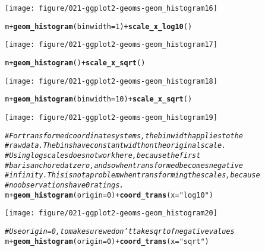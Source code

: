 \documentclass[a4paper,titlepage]{tufte-handout}\usepackage[]{graphicx}\usepackage[]{color}
\makeatletter
\def\maxwidth{ %
  \ifdim\Gin@nat@width>\linewidth
    \linewidth
  \else
    \Gin@nat@width
  \fi
}
\newcommand{\hlnum}[1]{\textcolor[rgb]{0.686,0.059,0.569}{#1}}%
\newcommand{\hlstr}[1]{\textcolor[rgb]{0.192,0.494,0.8}{#1}}%
\newcommand{\hlcom}[1]{\textcolor[rgb]{0.678,0.584,0.686}{\textit{#1}}}%
\newcommand{\hlopt}[1]{\textcolor[rgb]{0,0,0}{#1}}%
\newcommand{\hlstd}[1]{\textcolor[rgb]{0.345,0.345,0.345}{#1}}%
\newcommand{\hlkwc}[1]{\textcolor[rgb]{0.333,0.667,0.333}{#1}}%
\newcommand{\hlkwd}[1]{\textcolor[rgb]{0.737,0.353,0.396}{\textbf{#1}}}%
\newenvironment{kframe}{%
 \def\at@end@of@kframe{}%
 \ifinner\ifhmode%
  \def\at@end@of@kframe{\end{minipage}}%
  \begin{minipage}{\columnwidth}%
 \fi\fi%
 \def\FrameCommand##1{\hskip\@totalleftmargin \hskip-\fboxsep
 \colorbox{shadecolor}{##1}\hskip-\fboxsep
     \hskip-\linewidth \hskip-\@totalleftmargin \hskip\columnwidth}%
 \MakeFramed {\advance\hsize-\width
   \@totalleftmargin\z@ \linewidth\hsize
   \@setminipage}}%
 {\par\unskip\endMakeFramed%
 \at@end@of@kframe}
\newenvironment{knitrout}{}{} %
\makeatother
\begin{document}
\begin{knitrout}
\begin{kframe}
{\ttfamily\noindent\itshape\color{messagecolor}{\#\# stat\_bin: binwidth defaulted to range/30. Use 'binwidth = x' to adjust this.}}\end{kframe}
\texttt{[image: figure/021-ggplot2-geoms-geom\_histogram16]} 
\begin{kframe}\begin{alltt}
\hlstd{m} \hlopt{+} \hlkwd{geom_histogram}\hlstd{(}\hlkwc{binwidth} \hlstd{=} \hlnum{1}\hlstd{)} \hlopt{+} \hlkwd{scale_x_log10}\hlstd{()}
\end{alltt}
\end{kframe}
\texttt{[image: figure/021-ggplot2-geoms-geom\_histogram17]} 
\begin{kframe}\begin{alltt}
\hlstd{m} \hlopt{+} \hlkwd{geom_histogram}\hlstd{()} \hlopt{+} \hlkwd{scale_x_sqrt}\hlstd{()}
\end{alltt}


{\ttfamily\noindent\itshape\color{messagecolor}{\#\# stat\_bin: binwidth defaulted to range/30. Use 'binwidth = x' to adjust this.}}\end{kframe}
\texttt{[image: figure/021-ggplot2-geoms-geom\_histogram18]} 
\begin{kframe}\begin{alltt}
\hlstd{m} \hlopt{+} \hlkwd{geom_histogram}\hlstd{(}\hlkwc{binwidth} \hlstd{=} \hlnum{10}\hlstd{)} \hlopt{+} \hlkwd{scale_x_sqrt}\hlstd{()}
\end{alltt}
\end{kframe}
\texttt{[image: figure/021-ggplot2-geoms-geom\_histogram19]} 
\begin{kframe}\begin{alltt}
\hlcom{# For transformed coordinate systems, the binwidth applies to the}
\hlcom{# raw data.  The bins have constant width on the original scale.}
\hlcom{# Using log scales does not work here, because the first}
\hlcom{# bar is anchored at zero, and so when transformed becomes negative}
\hlcom{# infinity.  This is not a problem when transforming the scales, because}
\hlcom{# no observations have 0 ratings.}
\hlstd{m} \hlopt{+} \hlkwd{geom_histogram}\hlstd{(}\hlkwc{origin} \hlstd{=} \hlnum{0}\hlstd{)} \hlopt{+} \hlkwd{coord_trans}\hlstd{(}\hlkwc{x} \hlstd{=} \hlstr{"log10"}\hlstd{)}
\end{alltt}


{\ttfamily\noindent\itshape\color{messagecolor}{\#\# stat\_bin: binwidth defaulted to range/30. Use 'binwidth = x' to adjust this.}}\end{kframe}
\texttt{[image: figure/021-ggplot2-geoms-geom\_histogram20]} 
\begin{kframe}\begin{alltt}
\hlcom{# Use origin = 0, to make sure we don't take sqrt of negative values}
\hlstd{m} \hlopt{+} \hlkwd{geom_histogram}\hlstd{(}\hlkwc{origin} \hlstd{=} \hlnum{0}\hlstd{)} \hlopt{+} \hlkwd{coord_trans}\hlstd{(}\hlkwc{x} \hlstd{=} \hlstr{"sqrt"}\hlstd{)}
\end{alltt}



\end{kframe}
\end{knitrout}
\end{document}
